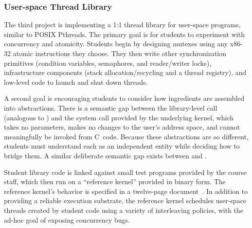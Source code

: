 \subsubsection{User-space Thread Library}

The third project is implementing a 1:1 thread library for
user-space programs,
similar to POSIX Pthreads.
The primary goal is
for students to experiment
with concurrency and atomicity.
Students begin by designing mutexes using any
x86-32 atomic instructions they choose.
They then write other synchronization
primitives (condition variables, semaphores,
and reader/writer locks), infrastructure
components (stack allocation/recycling and
a thread registry),
and low-level code to launch and shut down
threads.

A second goal is encouraging students to
consider how ingredients are assembled into
abstractions.
There is a semantic gap
between the library-level 
call (analogous to )
and the  system call provided
by the underlying kernel,
which takes no parameters,
makes no changes to the user's address space,
and cannot meaningfully
be invoked from C~code.
Because these abstractions are so different,
students must
understand each as an independent entity while
deciding how to bridge them.
A similar deliberate semantic gap exists between
 and .

Student library code is linked against small
test programs provided by the course staff,
which then run on a ``reference kernel'' provided in binary form.
The reference kernel's behavior is specified
in a twelve-page document~\cite{kspec-anonymized}.
In addition to providing a reliable execution
substrate,
the reference kernel
schedules user-space threads created by
student code using a variety of
interleaving policies,
with the ad-hoc goal of exposing concurrency bugs.

